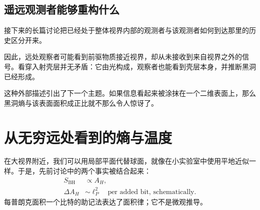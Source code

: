 
\subsection{遥远观测者能够重构什么}

接下来的长篇讨论把已经处于整体视界内部的观测者与该观测者如何到达那里的历史区分开来。

\begin{classroomqa}
\end{classroomqa}

因此，远处观察者可能看到前驱物质接近视界，却从未接收到来自视界之外的信号。看穿入射壳层并无矛盾：它由光构成，观察者也能看到壳层本身，并推断黑洞已经形成。

\begin{classroomqa}
\end{classroomqa}

\begin{classroomqa}
\end{classroomqa}

这种外部描述引出了下一个主题。如果信息看起来被涂抹在一个二维表面上，那么黑洞熵与该表面面积成正比就不那么令人惊讶了。

\section{从无穷远处看到的熵与温度}

在大视界附近，我们可以用局部平面代替球面，就像在小实验室中使用平地近似一样。于是，先前讨论中的两个事实被结合起来：
\begin{equation}
\begin{aligned}
S_{\mathrm{BH}}&\propto A_H,\\
\Delta A_H&\sim \ell_P^2
\quad\text{per added bit, schematically}.
\end{aligned}
\end{equation}
每普朗克面积一个比特的助记法表达了面积律；它不是微观推导。

